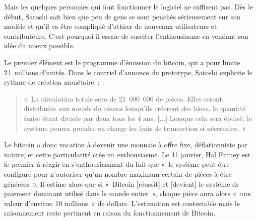 

Mais les quelques personnes qui font fonctionner le logiciel ne suffisent pas. Dès le début, Satoshi sait bien que peu de gens se sont penchés sérieusement sur son modèle et qu'il va être compliqué d'attirer de nouveaux utilisateurs et contributeurs. C'est pourquoi il essaie de susciter l'enthousiasme en vendant son idée du mieux possible.


Le premier élément est le programme d'émission du bitcoin, qui a pour limite 21~millions d'unités. Dans le courriel d'annonce du prototype, Satoshi explicite le rythme de création monétaire~:

\begin{quote}
«~La circulation totale sera de 21~000~000 de pièces. Elles seront distribuées aux nœuds du réseau lorsqu'ils créeront des blocs, la quantité émise étant divisée par deux tous les 4 ans. [...] Lorsque cela sera épuisé, le système pourra prendre en charge les frais de transaction si nécessaire.~»
\end{quote} %

Le bitcoin a donc vocation à devenir une monnaie à offre fixe, déflationniste par nature, et cette particularité crée un enthousiasme. Le 11 janvier, Hal Finney est le premier à réagir en s'enthousiasmant du fait que «~le système peut être configuré pour n'autoriser qu'un nombre maximum certain de pièces à être générées~». Il estime alors que si «~Bitcoin [réussit] et [devient] le système de paiement dominant utilisé dans le monde entier~», chaque pièce aura alors «~une valeur d'environ 10 millions~» de dollars. L'estimation est contestable mais le raisonnement reste pertinent en raison du fonctionnement de Bitcoin.

